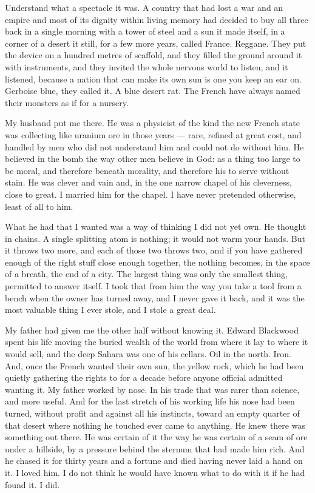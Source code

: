 Understand what a spectacle it was. A country that had lost a war and an empire and most of its dignity within living memory had decided to buy all three back in a single morning with a tower of steel and a sun it made itself, in a corner of a desert it still, for a few more years, called France. Reggane. They put the device on a hundred metres of scaffold, and they filled the ground around it with instruments, and they invited the whole nervous world to listen, and it listened, because a nation that can make its own sun is one you keep an ear on. Gerboise blue, they called it. A blue desert rat. The French have always named their monsters as if for a nursery.\par

My husband put me there. He was a physicist of the kind the new French state was collecting like uranium ore in those years --- rare, refined at great cost, and handled by men who did not understand him and could not do without him. He believed in the bomb the way other men believe in God: as a thing too large to be moral, and therefore beneath morality, and therefore his to serve without stain. He was clever and vain and, in the one narrow chapel of his cleverness, close to great. I married him for the chapel. I have never pretended otherwise, least of all to him.\par

What he had that I wanted was a way of thinking I did not yet own. He thought in chains. A single splitting atom is nothing; it would not warm your hands. But it throws two more, and each of those two throws two, and if you have gathered enough of the right stuff close enough together, the nothing becomes, in the space of a breath, the end of a city. The largest thing was only the smallest thing, permitted to answer itself. I took that from him the way you take a tool from a bench when the owner has turned away, and I never gave it back, and it was the most valuable thing I ever stole, and I stole a great deal.\par

My father had given me the other half without knowing it. Edward Blackwood spent his life moving the buried wealth of the world from where it lay to where it would sell, and the deep Sahara was one of his cellars. Oil in the north. Iron. And, once the French wanted their own sun, the yellow rock, which he had been quietly gathering the rights to for a decade before anyone official admitted wanting it. My father worked by nose. In his trade that was rarer than science, and more useful. And for the last stretch of his working life his nose had been turned, without profit and against all his instincts, toward an empty quarter of that desert where nothing he touched ever came to anything. He knew there was something out there. He was certain of it the way he was certain of a seam of ore under a hillside, by a pressure behind the sternum that had made him rich. And he chased it for thirty years and a fortune and died having never laid a hand on it. I loved him. I do not think he would have known what to do with it if he had found it. I did.\par

